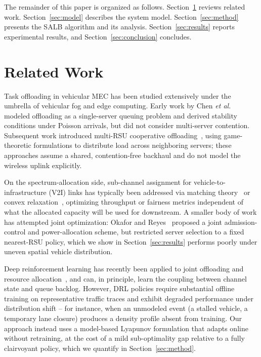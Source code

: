 \documentclass[journal,10pt]{IEEEtran}
\begin{document}
The remainder of this paper is organized as follows. Section~\ref{sec:related} reviews related work. Section~\ref{sec:model} describes the system model. Section~\ref{sec:method} presents the SALB algorithm and its analysis. Section~\ref{sec:results} reports experimental results, and Section~\ref{sec:conclusion} concludes.

\section{Related Work}
\label{sec:related}
Task offloading in vehicular MEC has been studied extensively under the umbrella of vehicular fog and edge computing. Early work by Chen \textit{et al.}~\cite{ref1} modeled offloading as a single-server queuing problem and derived stability conditions under Poisson arrivals, but did not consider multi-server contention. Subsequent work introduced multi-RSU cooperative offloading~\cite{ref2}, using game-theoretic formulations to distribute load across neighboring servers; these approaches assume a shared, contention-free backhaul and do not model the wireless uplink explicitly.

On the spectrum-allocation side, sub-channel assignment for vehicle-to-infrastructure (V2I) links has typically been addressed via matching theory~\cite{ref3} or convex relaxation~\cite{ref4}, optimizing throughput or fairness metrics independent of what the allocated capacity will be used for downstream. A smaller body of work has attempted joint optimization: Okafor and Reyes~\cite{ref5} proposed a joint admission-control and power-allocation scheme, but restricted server selection to a fixed nearest-RSU policy, which we show in Section~\ref{sec:results} performs poorly under uneven spatial vehicle distribution.

Deep reinforcement learning has recently been applied to joint offloading and resource allocation~\cite{ref6,ref7}, and can, in principle, learn the coupling between channel state and queue backlog. However, DRL policies require substantial offline training on representative traffic traces and exhibit degraded performance under distribution shift -- for instance, when an unmodeled event (a stalled vehicle, a temporary lane closure) produces a density profile absent from training. Our approach instead uses a model-based Lyapunov formulation that adapts online without retraining, at the cost of a mild sub-optimality gap relative to a fully clairvoyant policy, which we quantify in Section~\ref{sec:method}.
\end{document}
